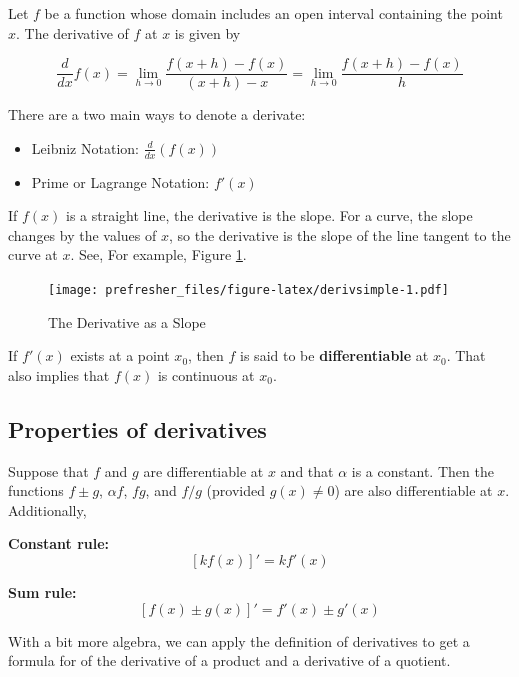\documentclass[]{book}
\providecommand{\tightlist}{%
  \setlength{\itemsep}{0pt}\setlength{\parskip}{0pt}}
\theoremstyle{definition}
\theoremstyle{definition}
\theoremstyle{definition}
\theoremstyle{remark}
\let\BeginKnitrBlock\begin \let\EndKnitrBlock\end
\begin{document}
\BeginKnitrBlock{definition}[Derivative]
\protect\hypertarget{def:unnamed-chunk-15}{}{\label{def:unnamed-chunk-15} {} }Let \(f\) be a function whose domain includes an open interval containing the point \(x\). The derivative of \(f\) at \(x\) is given by

\[\frac{d}{dx}f(x) =\lim\limits_{h\to 0} \frac{f(x+h)-f(x)}{(x+h)-x} = \lim\limits_{h\to 0} \frac{f(x+h)-f(x)}{h}
\]

There are a two main ways to denote a derivate:

\begin{itemize}
\tightlist
\item
  Leibniz Notation: \(\frac{d}{dx}(f(x))\)
\item
  Prime or Lagrange Notation: \(f'(x)\)
\end{itemize}
\EndKnitrBlock{definition}

If \(f(x)\) is a straight line, the derivative is the slope. For a curve, the slope changes by the values of \(x\), so the derivative is the slope of the line tangent to the curve at \(x\). See, For example, Figure \ref{fig:derivsimple}.

\begin{figure}
\centering
\texttt{[image: prefresher\_files/figure-latex/derivsimple-1.pdf]}
\caption{\label{fig:derivsimple}The Derivative as a Slope}
\end{figure}

If \(f'(x)\) exists at a point \(x_0\), then \(f\) is said to be \textbf{differentiable} at \(x_0\). That also implies that \(f(x)\) is continuous at \(x_0\).

\hypertarget{properties-of-derivatives}{%
\subsection*{Properties of derivatives}\label{properties-of-derivatives}}

Suppose that \(f\) and \(g\) are differentiable at \(x\) and that \(\alpha\) is a constant. Then the functions \(f\pm g\), \(\alpha f\), \(f g\), and \(f/g\) (provided \(g(x)\ne 0\)) are also differentiable at \(x\). Additionally,

\textbf{Constant rule:} \[\left[k f(x)\right]' = k f'(x)\]

\textbf{Sum rule:} \[\left[f(x)\pm g(x)\right]' = f'(x)\pm g'(x)\]

With a bit more algebra, we can apply the definition of derivatives to get a formula for of the derivative of a product and a derivative of a quotient.
\end{document}
